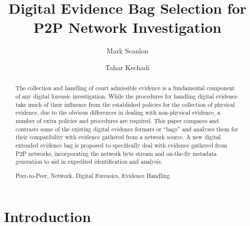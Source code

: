 \documentclass[runningheads,a4paper]{llncs}
\newcommand{\keywords}[1]{\par\addvspace\baselineskip
\noindent\keywordname\enspace\ignorespaces#1}
\begin{document}
\mainmatter  
\title{Digital Evidence Bag Selection for \\P2P Network Investigation}


\author{Mark Scanlon\and Tahar Kechadi}




\maketitle


\begin{abstract}
The collection and handling of court admissible evidence is a fundamental component of any digital forensic investigation. While the procedures for handling digital evidence take much of their influence from the established policies for the collection of physical evidence, due to the obvious differences in dealing with non-physical evidence, a number of extra policies and procedures are required. This paper compares and contrasts some of the existing digital evidence formats or ``bags'' and analyses them for their compatibility with evidence gathered from a network source. A new digital extended evidence bag is proposed to specifically deal with evidence gathered from P2P networks, incorporating the network byte stream and on-the-fly metadata generation to aid in expedited identification and analysis.
\keywords{Peer-to-Peer, Network, Digital Forensics, Evidence Handling}
\end{abstract}


\section{Introduction}
\end{document}
